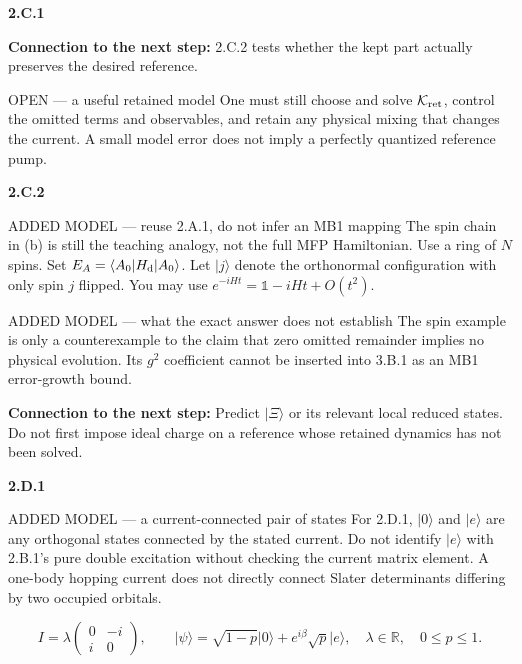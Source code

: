 \documentclass[11pt,a4paper]{article}
\newcommand{\ket}[1]{\lvert #1\rangle}
\newcommand{\bra}[1]{\langle #1\rvert}
\newcommand{\id}{\mathds 1}
\begin{document}
\par\medskip\textbf{2.C.1}\par
{\small\textbf{Connection to the next step:} 2.C.2 tests whether the kept part actually preserves the desired reference.}\par
\begin{redbox}{OPEN --- a useful retained model}
One must still choose and solve $\mathcal K_{\rm ret}$, control the omitted terms and observables, and retain any physical mixing that changes the current. A small model error does not imply a perfectly quantized reference pump.
\end{redbox}
\par\medskip\textbf{2.C.2}\par
\begin{redbox}{ADDED MODEL --- reuse 2.A.1, do not infer an MB1 mapping}
The spin chain in (b) is still the teaching analogy, not the full MFP Hamiltonian. Use a ring of $N$ spins. Set $E_A=\bra{A_0}H_{\rm d}\ket{A_0}$. Let $\ket{j}$ denote the orthonormal configuration with only spin $j$ flipped. You may use $e^{-iHt}=\id-iHt+O(t^2)$.
\end{redbox}
\begin{redbox}{ADDED MODEL --- what the exact answer does not establish}
The spin example is only a counterexample to the claim that zero omitted remainder implies no physical evolution. Its $g^2$ coefficient cannot be inserted into 3.B.1 as an MB1 error-growth bound.
\end{redbox}
{\small\textbf{Connection to the next step:} Predict $\ket\Xi$ or its relevant local reduced states. Do not first impose ideal charge on a reference whose retained dynamics has not been solved.}\par
\par\medskip\textbf{2.D.1}\par
\begin{redbox}{ADDED MODEL --- a current-connected pair of states}
For 2.D.1, $\ket0$ and $\ket e$ are any orthogonal states connected by the stated current. Do not identify $\ket e$ with 2.B.1's pure double excitation without checking the current matrix element. A one-body hopping current does not directly connect Slater determinants differing by two occupied orbitals.

\[
I=\lambda\begin{pmatrix}0&-i\\i&0\end{pmatrix},\qquad
\ket\psi=\sqrt{1-p}\ket0+e^{i\beta}\sqrt p\ket e,
\quad \lambda\in\mathbb R,\quad0\leq p\leq1.
\]
\end{redbox}
\end{document}
